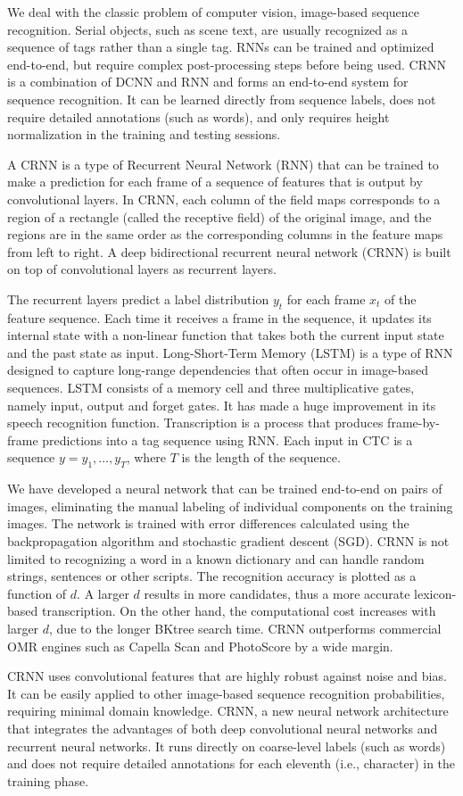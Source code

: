 We deal with the classic problem of computer vision, image-based sequence
recognition. Serial objects, such as scene text, are usually recognized as
a sequence of tags rather than a single tag. RNNs can be trained and optimized
end-to-end, but require complex post-processing steps before being used. CRNN is
a combination of DCNN and RNN and forms an end-to-end system for sequence
recognition. It can be learned directly from sequence labels, does not require
detailed annotations (such as words), and only requires height normalization in
the training and testing sessions.

A CRNN is a type of Recurrent Neural Network (RNN) that can be trained to make
a prediction for each frame of a sequence of features that is output by
convolutional layers. In CRNN, each column of the field maps corresponds to
a region of a rectangle (called the receptive field) of the original image, and
the regions are in the same order as the corresponding columns in the feature
maps from left to right. A deep bidirectional recurrent neural network (CRNN) is
built on top of convolutional layers as recurrent layers.

The recurrent layers predict a label distribution $y_t$ for each frame $x_t$ of
the feature sequence. Each time it receives a frame in the sequence, it updates
its internal state with a non-linear function that takes both the current input
state and the past state as input. Long-Short-Term Memory (LSTM) is a type of
RNN designed to capture long-range dependencies that often occur in image-based
sequences. LSTM consists of a memory cell and three multiplicative gates, namely
input, output and forget gates. It has made a huge improvement in its speech
recognition function.  Transcription is a process that produces frame-by-frame
predictions into a tag sequence using RNN. Each input in CTC is a sequence $y
= y_1, \dots , y_T$, where $T$ is the length of the sequence.

We have developed a neural network that can be trained end-to-end on pairs of
images, eliminating the manual labeling of individual components on the training
images. The network is trained with error differences calculated using the
backpropagation algorithm and stochastic gradient descent (SGD).  CRNN is not
limited to recognizing a word in a known dictionary and can handle random
strings, sentences or other scripts.  The recognition accuracy is plotted as
a function of $d$. A larger $d$ results in more candidates, thus a more accurate
lexicon-based transcription. On the other hand, the computational cost increases
with larger $d$, due to the longer BKtree search time. CRNN outperforms
commercial OMR engines such as Capella Scan and PhotoScore by a wide margin.

CRNN uses convolutional features that are highly robust against noise and bias.
It can be easily applied to other image-based sequence recognition
probabilities, requiring minimal domain knowledge.  CRNN, a new neural network
architecture that integrates the advantages of both deep convolutional neural
networks and recurrent neural networks. It runs directly on coarse-level labels
(such as words) and does not require detailed annotations for each eleventh
(i.e., character) in the training phase.
